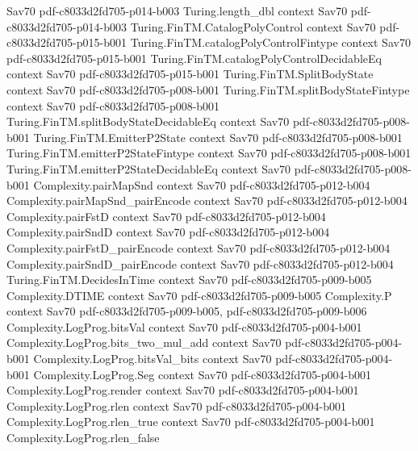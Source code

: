 \begin{theorem}
  {Sav70}
  {pdf-c8033d2fd705-p014-b003}
\proofstep
  {Turing.length_dbl}
  {context}
  {Sav70}
  {pdf-c8033d2fd705-p014-b003}
\proofstep
  {Turing.FinTM.CatalogPolyControl}
  {context}
  {Sav70}
  {pdf-c8033d2fd705-p015-b001}
\proofstep
  {Turing.FinTM.catalogPolyControlFintype}
  {context}
  {Sav70}
  {pdf-c8033d2fd705-p015-b001}
\proofstep
  {Turing.FinTM.catalogPolyControlDecidableEq}
  {context}
  {Sav70}
  {pdf-c8033d2fd705-p015-b001}
\proofstep
  {Turing.FinTM.SplitBodyState}
  {context}
  {Sav70}
  {pdf-c8033d2fd705-p008-b001}
\proofstep
  {Turing.FinTM.splitBodyStateFintype}
  {context}
  {Sav70}
  {pdf-c8033d2fd705-p008-b001}
\proofstep
  {Turing.FinTM.splitBodyStateDecidableEq}
  {context}
  {Sav70}
  {pdf-c8033d2fd705-p008-b001}
\proofstep
  {Turing.FinTM.EmitterP2State}
  {context}
  {Sav70}
  {pdf-c8033d2fd705-p008-b001}
\proofstep
  {Turing.FinTM.emitterP2StateFintype}
  {context}
  {Sav70}
  {pdf-c8033d2fd705-p008-b001}
\proofstep
  {Turing.FinTM.emitterP2StateDecidableEq}
  {context}
  {Sav70}
  {pdf-c8033d2fd705-p008-b001}
\proofstep
  {Complexity.pairMapSnd}
  {context}
  {Sav70}
  {pdf-c8033d2fd705-p012-b004}
\proofstep
  {Complexity.pairMapSnd_pairEncode}
  {context}
  {Sav70}
  {pdf-c8033d2fd705-p012-b004}
\proofstep
  {Complexity.pairFstD}
  {context}
  {Sav70}
  {pdf-c8033d2fd705-p012-b004}
\proofstep
  {Complexity.pairSndD}
  {context}
  {Sav70}
  {pdf-c8033d2fd705-p012-b004}
\proofstep
  {Complexity.pairFstD_pairEncode}
  {context}
  {Sav70}
  {pdf-c8033d2fd705-p012-b004}
\proofstep
  {Complexity.pairSndD_pairEncode}
  {context}
  {Sav70}
  {pdf-c8033d2fd705-p012-b004}
\proofstep
  {Turing.FinTM.DecidesInTime}
  {context}
  {Sav70}
  {pdf-c8033d2fd705-p009-b005}
\proofstep
  {Complexity.DTIME}
  {context}
  {Sav70}
  {pdf-c8033d2fd705-p009-b005}
\proofstep
  {Complexity.P}
  {context}
  {Sav70}
  {pdf-c8033d2fd705-p009-b005,
    pdf-c8033d2fd705-p009-b006}
\proofstep
  {Complexity.LogProg.bitsVal}
  {context}
  {Sav70}
  {pdf-c8033d2fd705-p004-b001}
\proofstep
  {Complexity.LogProg.bits_two_mul_add}
  {context}
  {Sav70}
  {pdf-c8033d2fd705-p004-b001}
\proofstep
  {Complexity.LogProg.bitsVal_bits}
  {context}
  {Sav70}
  {pdf-c8033d2fd705-p004-b001}
\proofstep
  {Complexity.LogProg.Seg}
  {context}
  {Sav70}
  {pdf-c8033d2fd705-p004-b001}
\proofstep
  {Complexity.LogProg.render}
  {context}
  {Sav70}
  {pdf-c8033d2fd705-p004-b001}
\proofstep
  {Complexity.LogProg.rlen}
  {context}
  {Sav70}
  {pdf-c8033d2fd705-p004-b001}
\proofstep
  {Complexity.LogProg.rlen_true}
  {context}
  {Sav70}
  {pdf-c8033d2fd705-p004-b001}
\proofstep
  {Complexity.LogProg.rlen_false}

\end{theorem}
